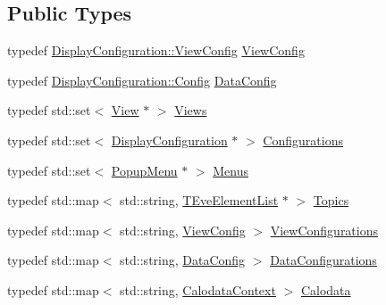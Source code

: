 \subsection*{Public Types}
\begin{DoxyCompactItemize}
\item 
typedef \hyperlink{class_d_d4hep_1_1_display_configuration_1_1_view_config}{Display\+Configuration\+::\+View\+Config} \hyperlink{class_d_d4hep_1_1_display_a7be76e4de32d9d1084a6ca2f52669f68}{View\+Config}
\item 
typedef \hyperlink{class_d_d4hep_1_1_display_configuration_1_1_config}{Display\+Configuration\+::\+Config} \hyperlink{class_d_d4hep_1_1_display_a79237f24a5b3ec781faa5f8e20579ae0}{Data\+Config}
\item 
typedef std\+::set$<$ \hyperlink{class_d_d4hep_1_1_view}{View} $\ast$ $>$ \hyperlink{class_d_d4hep_1_1_display_a93fcdf6ec0390291e26d59d0d78cd6e8}{Views}
\item 
typedef std\+::set$<$ \hyperlink{class_d_d4hep_1_1_display_configuration}{Display\+Configuration} $\ast$ $>$ \hyperlink{class_d_d4hep_1_1_display_a6e411e86cfcb41b915d77edf154265dd}{Configurations}
\item 
typedef std\+::set$<$ \hyperlink{class_d_d4hep_1_1_popup_menu}{Popup\+Menu} $\ast$ $>$ \hyperlink{class_d_d4hep_1_1_display_a4dbc259bd581b56802ef3c29b72909be}{Menus}
\item 
typedef std\+::map$<$ std\+::string, \hyperlink{class_t_eve_element_list}{T\+Eve\+Element\+List} $\ast$ $>$ \hyperlink{class_d_d4hep_1_1_display_ab7cf442eb2211f57f55b7cd1cf8a61c1}{Topics}
\item 
typedef std\+::map$<$ std\+::string, \hyperlink{class_d_d4hep_1_1_display_a7be76e4de32d9d1084a6ca2f52669f68}{View\+Config} $>$ \hyperlink{class_d_d4hep_1_1_display_a1bb7fbc1eeb22ef2b1cea35c78e9d27a}{View\+Configurations}
\item 
typedef std\+::map$<$ std\+::string, \hyperlink{class_d_d4hep_1_1_display_a79237f24a5b3ec781faa5f8e20579ae0}{Data\+Config} $>$ \hyperlink{class_d_d4hep_1_1_display_a730a4516989abe8b2f788c8f957e0633}{Data\+Configurations}
\item 
typedef std\+::map$<$ std\+::string, \hyperlink{struct_d_d4hep_1_1_display_1_1_calodata_context}{Calodata\+Context} $>$ \hyperlink{class_d_d4hep_1_1_display_a692339ace65797a205d2332c4a652598}{Calodata}
\end{DoxyCompactItemize}

